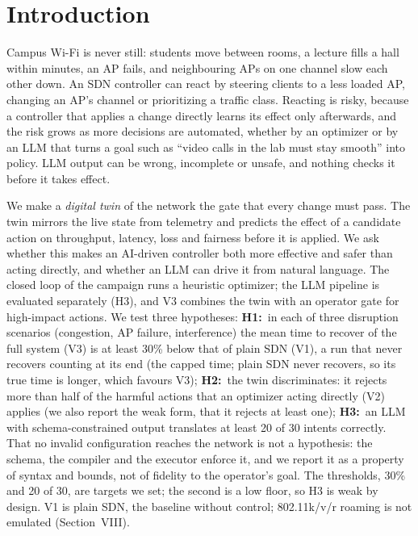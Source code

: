 \documentclass[conference]{IEEEtran}
\begin{document}
\section{Introduction}
Campus Wi-Fi is never still: students move between rooms, a lecture fills a hall within minutes, an AP fails, and neighbouring APs on one channel slow each other down. An SDN controller can react by steering clients to a less loaded AP, changing an AP's channel or prioritizing a traffic class. Reacting is risky, because a controller that applies a change directly learns its effect only afterwards, and the risk grows as more decisions are automated, whether by an optimizer or by an LLM that turns a goal such as ``video calls in the lab must stay smooth'' into policy. LLM output can be wrong, incomplete or unsafe, and nothing checks it before it takes effect.

We make a \emph{digital twin} of the network the gate that every change must pass. The twin mirrors the live state from telemetry and predicts the effect of a candidate action on throughput, latency, loss and fairness before it is applied. We ask whether this makes an AI-driven controller both more effective and safer than acting directly, and whether an LLM can drive it from natural language. The closed loop of the campaign runs a heuristic optimizer; the LLM pipeline is evaluated separately (H3), and V3 combines the twin with an operator gate for high-impact actions. We test three hypotheses:
\textbf{H1:}~in each of three disruption scenarios (congestion, AP failure, interference) the mean time to recover of the full system (V3) is at least 30\% below that of plain SDN (V1), a run that never recovers counting at its end (the capped time; plain SDN never recovers, so its true time is longer, which favours V3);
\textbf{H2:}~the twin discriminates: it rejects more than half of the harmful actions that an optimizer acting directly (V2) applies (we also report the weak form, that it rejects at least one);
\textbf{H3:}~an LLM with schema-constrained output translates at least 20 of 30 intents correctly. That no invalid configuration reaches the network is not a hypothesis: the schema, the compiler and the executor enforce it, and we report it as a property of syntax and bounds, not of fidelity to the operator's goal. The thresholds, 30\% and 20 of 30, are targets we set; the second is a low floor, so H3 is weak by design. V1 is plain SDN, the baseline without control; 802.11k/v/r roaming is not emulated (Section~VIII).
\end{document}
